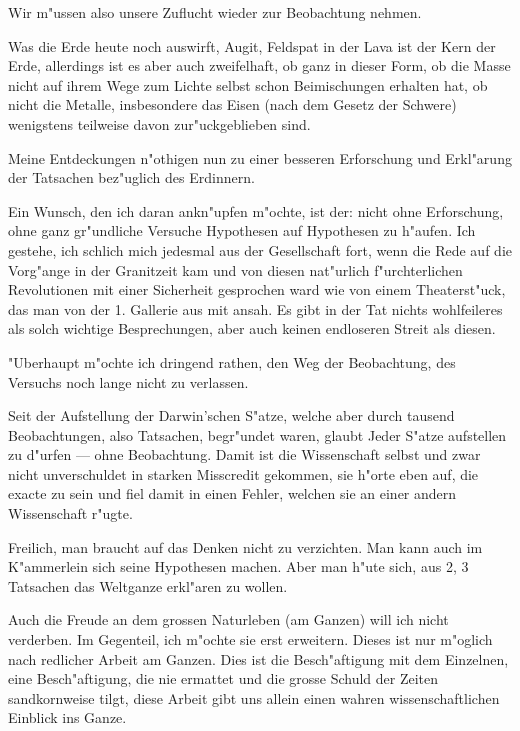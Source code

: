 \documentclass[a4paper, 11pt, oneside, german]{article}
\begin{document}
Wir m"ussen also unsere Zuflucht wieder zur Beobachtung nehmen.

Was die Erde heute noch auswirft, Augit, Feldspat in der Lava ist der Kern der Erde, allerdings ist es aber auch zweifelhaft, ob ganz in dieser Form, ob die Masse nicht auf ihrem Wege zum Lichte selbst schon Beimischungen erhalten hat, ob nicht die Metalle, insbesondere das Eisen (nach dem Gesetz der Schwere) wenigstens teilweise davon zur"uckgeblieben sind.

Meine Entdeckungen n"othigen nun zu einer besseren Erforschung und Erkl"arung der Tatsachen bez"uglich des Erdinnern.

Ein Wunsch, den ich daran ankn"upfen m"ochte, ist der: nicht ohne Erforschung, ohne ganz gr"undliche Versuche Hypothesen auf Hypothesen zu h"aufen. Ich gestehe, ich schlich mich jedesmal aus der Gesellschaft fort, wenn die Rede auf die Vorg"ange in der Granitzeit kam und von diesen nat"urlich f"urchterlichen Revolutionen mit einer Sicherheit gesprochen ward wie von einem Theaterst"uck, das man von der 1. Gallerie aus mit ansah. Es gibt in der Tat nichts wohlfeileres als solch wichtige Besprechungen, aber auch keinen endloseren Streit als diesen.

"Uberhaupt m"ochte ich dringend rathen, den Weg der Beobachtung, des Versuchs noch lange nicht zu verlassen.

Seit der Aufstellung der Darwin'schen S"atze, welche aber durch tausend Beobachtungen, also Tatsachen, begr"undet waren, glaubt Jeder S"atze aufstellen zu d"urfen --- ohne Beobachtung. Damit ist die Wissenschaft selbst und zwar nicht unverschuldet in starken Misscredit gekommen, sie h"orte eben auf, die exacte zu sein und fiel damit in einen Fehler, welchen sie an einer andern Wissenschaft r"ugte.

Freilich, man braucht auf das Denken nicht zu verzichten. Man kann auch im K"ammerlein sich seine Hypothesen machen. Aber man h"ute sich, aus 2, 3 Tatsachen das Weltganze erkl"aren zu wollen.

Auch die Freude an dem grossen Naturleben (am Ganzen) will ich nicht verderben. Im Gegenteil, ich m"ochte sie erst erweitern. Dieses ist nur m"oglich nach redlicher Arbeit am Ganzen. Dies ist die Besch"aftigung mit dem Einzelnen, eine Besch"aftigung, die nie ermattet und die grosse Schuld der Zeiten sandkornweise tilgt, diese Arbeit gibt uns allein einen wahren wissenschaftlichen Einblick ins Ganze.
\clearpage
\section{}
\end{document}
